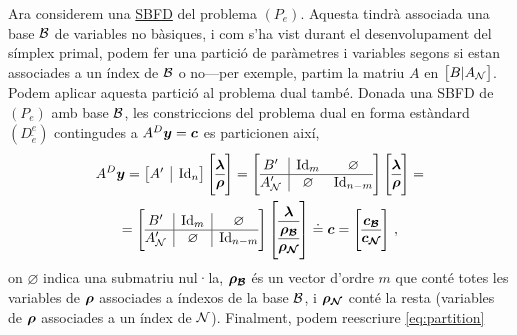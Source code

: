 Ara considerem una \hyperref[defi:SBFD]{SBFD} del problema $(P_e)$. Aquesta
tindrà associada una base $\mathcal{B}$ de variables no bàsiques, i com s'ha vist durant
el desenvolupament del símplex primal, podem fer una partició de paràmetres i
variables segons si estan associades a un índex de $\mathcal{B}$ o no---per exemple,
partim la matriu $A$ en $\left[B\vert A_{\mathcal{N}}\right]$. Podem aplicar aquesta
partició al problema dual també. Donada una SBFD de $(P_e)$ amb base $\mathcal{B}$, les
constriccions del problema dual en forma estàndard $(D^e_{\tilde{e}})$
contingudes a $A^D\boldsymbol{y} = \boldsymbol{c}$ es particionen així,
\begin{multline}\label{eq:partition}
A^D\vb{y} =
\left[\begin{array}{{@{}c|c@{}}}
A' & \Id_n
\end{array}\right]
\left[\begin{array}{{@{}c@{}}}
\vb{\lambda}\\
\hline
\vb{\rho}
\end{array}\right] 
=
\left[\begin{array}{{@{}c|cc@{}}}
B'		& \Id_m 		  &	\varnothing	\\
\hline
A_\N' 	& \varnothing & \Id_{n-m}
\end{array}\right]
\left[\begin{array}{{@{}c@{}}}
\vb{\lambda}\\
\hline
\vb{\rho}
\end{array}\right] 
=\\
=
\left[\begin{array}{{@{}c|c|c@{}}}
B'		& \Id_m 		  &	\varnothing	\\
\hline
A_\N' 	& \varnothing & \Id_{n-m}
\end{array}\right]
\left[\begin{array}{{@{}c@{}}}
\vb{\lambda}\\
\hline
\vb{\rho_\B}\\
\hline
\vb{\rho_\N}
\end{array}\right]
\doteq \vb{c}
=
\left[\begin{array}{{@{}c@{}}}
\vb{c_\B}\\
\hline
\vb{c_\N}
\end{array}\right]\,,
\end{multline}
on $\varnothing$ indica una submatriu nul·la, $\boldsymbol{\rho_{\mathcal{B}}}$ és un vector
d'ordre $m$ que conté totes les variables de $\boldsymbol{\rho}$ associades a índexos de
la base $\mathcal{B}$, i $\boldsymbol{\rho_{\mathcal{N}}}$ conté la resta (variables de $\boldsymbol{\rho}$
associades a un índex de $\mathcal{N}$). Finalment, podem reescriure \eqref{eq:partition}

